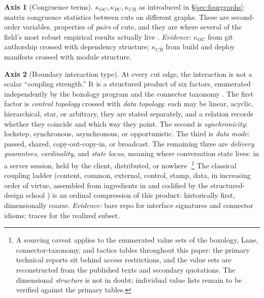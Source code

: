 \documentclass[11pt,oneside]{article}
\theoremstyle{definition}
\newtheorem{axis}{Axis}
\begin{document}
\begin{axis}[Congruence terms]\label{ax:congruence}
$\kappa_{OC}, \kappa_{PC}, \kappa_{CR}$ as introduced in \S\ref{sec:fourgraphs}: matrix
congruence statistics between cuts on different graphs. These are second-order variables,
properties of \emph{pairs} of cuts, and they are where several of the field's most robust
empirical results actually live \cite{nagappan2008,maccormack2012,cataldo2008,accelerate2018}.
\emph{Evidence:} $\kappa_{OC}$ from git authorship crossed with dependency structure;
$\kappa_{CR}$ from build and deploy manifests crossed with module structure.
\end{axis}

\begin{axis}[Boundary interaction type]\label{sec:boundarytype}
At every cut edge, the interaction is not a scalar ``coupling strength.'' It is a structured
product of six factors, enumerated independently by the boxology program \cite{boxology1997}
and the connector taxonomy \cite{mehta2000}. The first factor is \emph{control topology}
crossed with \emph{data topology}: each may be linear, acyclic, hierarchical, star, or
arbitrary, they are stated separately, and a relation records whether they coincide and which
way they point. The second is \emph{synchronicity}: lockstep, synchronous, asynchronous, or
opportunistic. The third is \emph{data mode}: passed, shared, copy-out-copy-in, or broadcast.
The remaining three are \emph{delivery guarantees}, \emph{cardinality}, and \emph{state locus},
meaning where conversation state lives: in a server session, held by the client, distributed,
or nowhere \cite{fielding2000}.\footnote{A sourcing caveat applies to the enumerated value sets of the
boxology, Lane, connector-taxonomy, and tactics tables throughout this paper: the primary
technical reports sit behind access restrictions, and the value sets are reconstructed from the
published texts and secondary quotations. The dimensional \emph{structure} is not in doubt;
individual value lists remain to be verified against the primary tables.} The classical coupling
ladder (content, common, external, control, stamp, data, in increasing order of virtue,
assembled from ingredients in \cite{stevens1974} and codified by the structured-design school
\cite{yourdon1979}) is an ordinal compression of this product: historically first, dimensionally
coarse. \emph{Evidence:} bare repo for interface signatures and connector idioms; traces for the
realized subset.
\end{axis}
\end{document}
